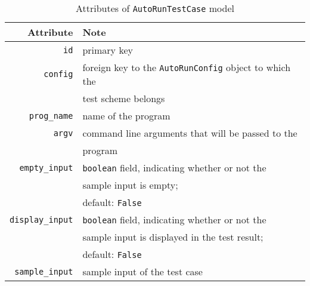 \begin{table}[h]
    \centering
    \caption{Attributes of \texttt{AutoRunTestCase} model}
    \label{tab:TC_ATTR}
    \renewcommand{\arraystretch}{1.3}
    \begin{tabular}[h]{r|l}
        \hline
        Attribute & Note \\
        \hline
        \hline

        \texttt{id} & primary key \\
        \hline
        \texttt{config} & foreign key to the \texttt{AutoRunConfig} object to
            which the \\ & test scheme belongs \\
        \hline
        \hline

        \texttt{prog\_name} & name of the program \\
        \hline
        \texttt{argv} & command line arguments that will be passed to the \\ & program \\
        \hline
        \hline

        \texttt{empty\_input} & \texttt{boolean} field, indicating whether or not the \\
            & sample input is empty; \\ & default: \texttt{False} \\
        \hline
        \texttt{display\_input} & \texttt{boolean} field, indicating whether or not the \\
            & sample input is displayed in the test result; \\ & default: \texttt{False} \\
        \hline
        \texttt{sample\_input} & sample input of the test case \\
        \hline
        \hline


\end{tabular}
\end{table}
